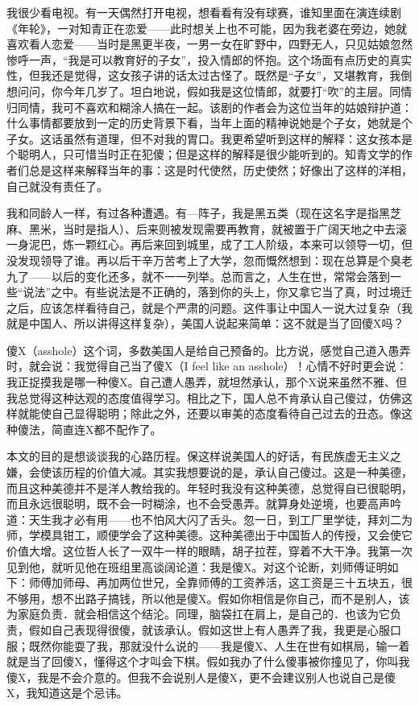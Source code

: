 我很少看电视。有一天偶然打开电视，想看看有没有球赛，谁知里面在演连续剧《年轮》，一对知青正在恋爱——此时想关上也不可能，因为我老婆在旁边，她就喜欢看人恋爱——当时是黑更半夜，一男一女在旷野中，四野无人，只见姑娘忽然惨呼一声，“我是可以教育好的子女”，投入情郎的怀抱。这个场面有点历史的真实性，但我还是觉得，这女孩子讲的话太过古怪了。既然是“子女”，又堪教育，我倒想问问，你今年几岁了。坦白地说，假如我是这位情郎，就要打“吹”的主层。同情归同情，我可不喜欢和糊涂人搞在一起。该剧的作者会为这位当年的姑娘辩护道：什么事情都要放到一定的历史背景下看，当年上面的精神说她是个子女，她就是个子女。这话虽然有道理，但不对我的胃口。我更希望听到这样的解释：这女孩本是个聪明人，只可惜当时正在犯傻；但是这样的解释是很少能听到的。知青文学的作者们总是这样来解释当年的事：这是时代使然，历史使然；好像出了这样的洋相，自己就没有责任了。 

我和同龄人一样，有过各种遭遇。有—阵子，我是黑五类（现在这名字是指黑芝麻、黑米，当时是指人）、后来则被发现需要再教育，就被置于广阔天地之中去滚一身泥巴，炼一颗红心。再后来回到城里，成了工人阶级，本来可以领导一切，但没发现领导了谁。再以后干辛万苦考上了大学，忽而慨然想到：现在总算是个臭老九了——以后的变化还多，就不一一列举。总而言之，人生在世，常常会落到一些“说法”之中。有些说法是不正确的，落到你的头上，你又拿它当了真，时过境迁之后，应该怎样看待自己，就是个严肃的问题。这件事让中国人一说大过复杂（我就是中国人、所以讲得这样复杂），美国人说起来简单：这不就是当了回傻X吗？ 

傻X（asshole）这个词，多数美国人是给自己预备的。比方说，感觉自己道入愚弄时，就会说：我觉得自己当了傻X（I feel like an asshole）！心情不好时更会说：我正捉摸我是哪一种傻X。自己遭人愚弄，就坦然承认，那个X说来虽然不雅、但我总觉得这种达观的态度值得学习。相比之下，国人总不肯承认自己傻过，仿佛这样就能使自己显得聪明；除此之外，还要以审美的态度看待自己过去的丑态。像这种傻法，简直连X都不配作了。 

本文的目的是想谈谈我的心路历程。保这样说美国人的好话，有民族虚无主义之嫌，会使该历程的价值大减。其实我想要说的是，承认自己傻过。这是一种美德，而且这种美德并不是洋人教给我的。年轻时我没有这种美德，总觉得自已很聪明，而且永远很聪明，既不会一时糊涂，也不会受愚弄。就算身处逆境，也要高声吟道：天生我才必有用——也不怕风大闪了舌头。忽一日，到工厂里学徒，拜刘二为师，学模具钳工，顺便学会了这种美德。这种美德出于中国哲人的传授，又会使它价值大增。这位哲人长了一双牛一样的眼睛，胡子拉茬，穿着不大干净。我第一次见到他，就听见他在班组里高谈阔论道：我是傻X。对这个论断，刘师傅证明如下：师傅加师母、再加两位世兄，全靠师傅的工资养活，这工资是三十五块五，很不够用，想不出路子搞钱，所以他是傻X。假如你相信是你自己，而不是别人，该为家庭负责．就会相信这个结沦。同理，脑袋扛在肩上，是自己的．也该为它负责，假如自己表现得很傻，就该承认。假如这世上有人愚弄了我，我更是心服口服；既然你能耍了我，那就没什么说的——我是傻X、人生在世有如棋局，输一着就是当了回傻X，懂得这个才叫会下棋。假如我办了什么傻事被你撞见了，你叫我傻X，我是不会介意的。但我不会说别人是傻X，更不会建议别人也说自己是傻X，我知道这是个忌讳。 

